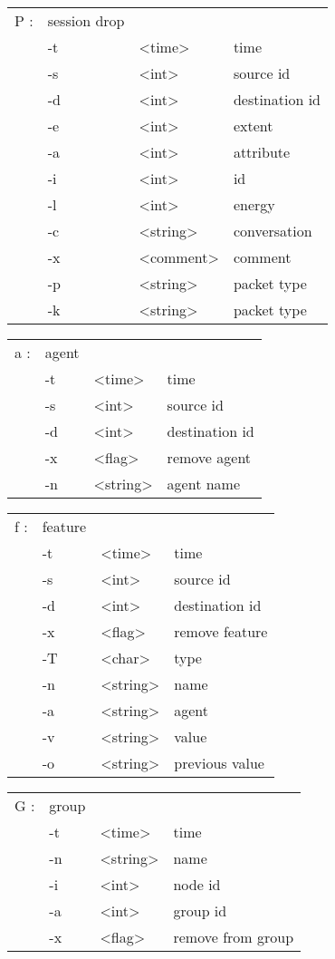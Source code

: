   \begin{tabular}{llll}
  P : & session drop & & \\
    &  -t & <time> & time \\
    &  -s & <int> & source id \\
    &  -d & <int> & destination id \\
    &  -e & <int> & extent \\
    &  -a & <int> & attribute \\
    &  -i & <int> & id \\
    &  -l & <int> & energy \\
    &  -c & <string> & conversation \\
    &  -x & <comment> & comment \\
    &  -p & <string> & packet type \\
    &  -k & <string> & packet type \\
  \end{tabular}

  \begin{tabular}{llll}
  a : & agent & & \\
    &  -t & <time> & time \\
    &  -s & <int> & source id \\
    &  -d & <int> & destination id \\
    &  -x & <flag> & remove agent \\
    &  -n & <string> & agent name \\
  \end{tabular}

  \begin{tabular}{llll}
  f : & feature & & \\
    &  -t & <time> & time \\
    &  -s & <int> & source id \\
    &  -d & <int> & destination id \\
    &  -x & <flag> & remove feature \\
    &  -T & <char> & type \\
    &  -n & <string> & name \\
    &  -a & <string> & agent \\
    &  -v & <string> & value \\
    &  -o & <string> & previous value \\
  \end{tabular}

  \begin{tabular}{llll}
  G : & group & & \\
    &  -t & <time> & time \\
    &  -n & <string> & name \\
    &  -i & <int> & node id \\
    &  -a & <int> & group id \\
    &  -x & <flag> & remove from group \\
  \end{tabular}


